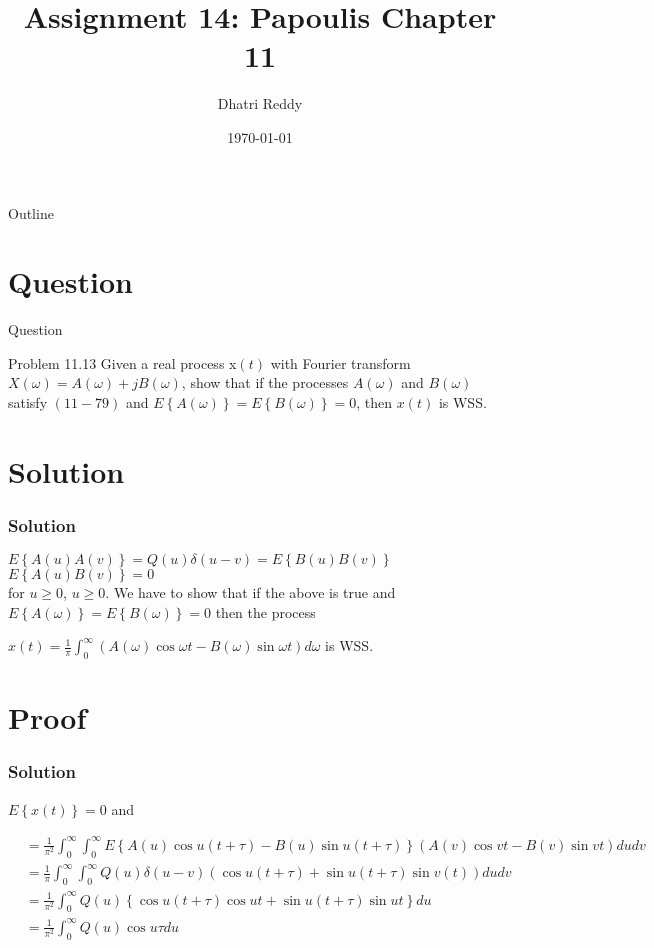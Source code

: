 \documentclass{beamer}
\title{Assignment 14: Papoulis Chapter 11 }
\author{Dhatri Reddy}
\date{\today}
\providecommand{\cbrak}[1]{\ensuremath{\left\{#1\right\}}}
\providecommand{\brak}[1]{\ensuremath{\left(#1\right)}}
\begin{document}
\begin{frame}
    \titlepage 
\end{frame}

\logo{}

\begin{frame}{Outline}
    \tableofcontents
\end{frame}

\section{Question}
\begin{frame}{Question}
    \begin{block}{Problem 11.13}
    Given a real process x\brak{t} with Fourier transform $X\brak{\omega} = A\brak{\omega} + jB\brak{\omega}$, show that if the processes $A\brak{\omega}$ and $B\brak{\omega}$ satisfy \brak{11-79} and $E\cbrak{A\brak{\omega}} = E\cbrak{B\brak{\omega}} = 0$, then $x\brak{t}$ is WSS.
\end{block}
\end{frame}

\section{Solution}
\begin{frame}
\frametitle{Solution}
$E\cbrak{A\brak{u}A\brak{v}} = Q\brak{u}\delta\brak{u-v} = E\cbrak{B\brak{u}B\brak{v}}$\\
$E\cbrak{A\brak{u}B\brak{v}}=0$\\
for $u\geq0$, $u\geq0$. We have to show that if the above is true and $E\cbrak{A\brak{\omega}} = E\cbrak{B\brak{\omega}} = 0$ then the process

$x\brak{t} = \frac{1}{\pi}\int_{0}^\infty\brak{A\brak{\omega}\cos{\omega t} - B\brak{\omega}\sin{\omega t}}d\omega$ is WSS.

\end{frame}

\section{Proof}
\begin{frame}
\frametitle{Solution}

$E\cbrak{x\brak{t}} = 0$ and 

\begin{align}
     &= \frac{1}{\pi^{2}}\int_{0}^\infty \int_{0}^\infty E\cbrak{A\brak{u}\cos{u\brak{t + \tau}} - B\brak{u}\sin{u\brak{t + \tau}}}\brak{A\brak{v}\cos{vt} - B\brak{v}\sin{vt}}du dv\\
    &= \frac{1}{\pi}\int_{0}^\infty \int_{0}^\infty Q\brak{u}\delta\brak{u-v}\brak{\cos{u\brak{t + \tau}} + \sin{u\brak{t + \tau}}\sin{v\brak{t}}}du dv\\
    &= \frac{1}{\pi^{2}}\int_{0}^\infty Q\brak{u}\cbrak{\cos{u\brak{t + \tau}}\cos{ut} + \sin{u\brak{t + \tau}}\sin{ut}}du\\
    &= \frac{1}{\pi^{2}}\int_{0}^\infty Q\brak{u}\cos{u\tau}du
\end{align}

\end{frame}
\end{document}
